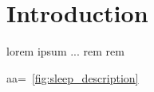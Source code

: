 \section{Introduction} \label{intro}

lorem ipsum ...
\Gls{rem}
\Gls{rem}


aa=~\ref{fig:sleep_description}

